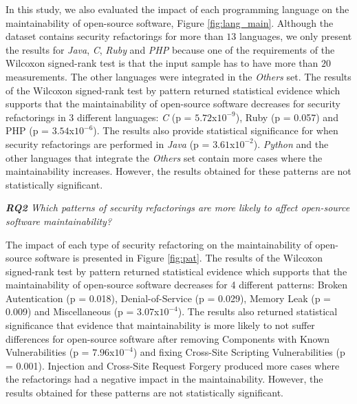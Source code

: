 \documentclass[10pt,conference]{IEEEtran}
\begin{document}
{In this study, we also evaluated the impact of each programming language on the
maintainability of open-source software, Figure \ref{fig:lang_main}. Although the
dataset contains security refactorings for more than $13$ languages, we only
present the results for \emph{Java}, \emph{C}, \emph{Ruby} and \emph{PHP} because
one of the requirements of the Wilcoxon signed-rank test is that the input sample
has to have more than $20$ measurements. The other languages were integrated in the
\emph{Others} set. The results of the Wilcoxon signed-rank test by pattern returned
statistical evidence which supports that the maintainability of open-source software
decreases for security refactorings in 3 different languages: \emph{C}
(p = $5.72$x$10^{-9}$), Ruby (p = 0.057) and PHP (p = $3.54$x$10^{-6}$). The results
also provide statistical significance for when security refactorings are performed
in \emph{Java} (p = $3.61$x$10^{-2}$). \emph{Python} and the other languages
that integrate the \emph{Others} set contain more cases where the maintainability
increases. However, the results obtained for these patterns are not statistically
significant.



\begin{framed}
\textit{\textbf{RQ2} Which patterns of security refactorings are more likely to
affect open-source software maintainability?}
\end{framed}

The impact of each type of security refactoring on the maintainability of
open-source software is presented in Figure \ref{fig:pat}. The results of the
Wilcoxon signed-rank test by pattern returned statistical evidence which
supports that the maintainability of open-source software decreases for 4
different patterns: Broken Autentication (p = 0.018), Denial-of-Service
(p = 0.029), Memory Leak (p = 0.009) and Miscellaneous (p = $3.07$x$10^{-4}$).
The results also returned statistical significance that evidence that maintainability
is more likely to not suffer differences for open-source software after removing
Components with Known Vulnerabilities (p = $7.96$x$10^{-4}$) and fixing Cross-Site
Scripting Vulnerabilities (p = 0.001). Injection and Cross-Site Request Forgery
produced more cases where the refactorings had a negative impact in the maintainability.
However, the results obtained for these patterns are not statistically significant.

}
\end{document}
